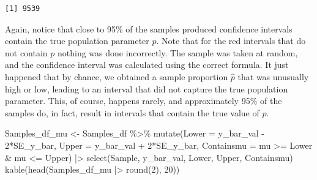 \documentclass[
  letterpaper,
  DIV=11,
  numbers=noendperiod]{scrreprt}
\newenvironment{Shaded}{\begin{snugshade}}{\end{snugshade}}
\newcommand{\AttributeTok}[1]{\textcolor[rgb]{0.40,0.45,0.13}{#1}}
\newcommand{\DecValTok}[1]{\textcolor[rgb]{0.68,0.00,0.00}{#1}}
\newcommand{\FunctionTok}[1]{\textcolor[rgb]{0.28,0.35,0.67}{#1}}
\newcommand{\NormalTok}[1]{\textcolor[rgb]{0.00,0.23,0.31}{#1}}
\newcommand{\OtherTok}[1]{\textcolor[rgb]{0.00,0.23,0.31}{#1}}
\newcommand{\SpecialCharTok}[1]{\textcolor[rgb]{0.37,0.37,0.37}{#1}}
\begin{document}
\begin{verbatim}
[1] 9539
\end{verbatim}

Again, notice that close to 95\% of the samples produced confidence
intervals contain the true population parameter \(p\). Note that for the
red intervals that do not contain \(p\) nothing was done incorrectly.
The sample was taken at random, and the confidence interval was
calculated using the correct formula. It just happened that by chance,
we obtained a sample proportion \(\hat{p}\) that was unusually high or
low, leading to an interval that did not capture the true population
parameter. This, of course, happens rarely, and approximately 95\% of
the samples do, in fact, result in intervals that contain the true value
of \(p\).

\begin{Shaded}
\begin{Highlighting}[]
\NormalTok{Samples\_df\_mu }\OtherTok{\textless{}{-}}\NormalTok{ Samples\_df }\SpecialCharTok{\%\textgreater{}\%} \FunctionTok{mutate}\NormalTok{(}\AttributeTok{Lower =}\NormalTok{ y\_bar\_val }\SpecialCharTok{{-}} \DecValTok{2}\SpecialCharTok{*}\NormalTok{SE\_y\_bar, }
                                     \AttributeTok{Upper =}\NormalTok{ y\_bar\_val }\SpecialCharTok{+} \DecValTok{2}\SpecialCharTok{*}\NormalTok{SE\_y\_bar,}
                                     \AttributeTok{Containsmu =}\NormalTok{ mu }\SpecialCharTok{\textgreater{}=}\NormalTok{ Lower }\SpecialCharTok{\&}\NormalTok{ mu }\SpecialCharTok{\textless{}=}\NormalTok{ Upper) }\SpecialCharTok{|\textgreater{}}
                              \FunctionTok{select}\NormalTok{(Sample, y\_bar\_val, Lower, Upper, Containsmu)  }
\FunctionTok{kable}\NormalTok{(}\FunctionTok{head}\NormalTok{(Samples\_df\_mu }\SpecialCharTok{|\textgreater{}} \FunctionTok{round}\NormalTok{(}\DecValTok{2}\NormalTok{), }\DecValTok{20}\NormalTok{))}
\end{Highlighting}
\end{Shaded}
\end{document}
